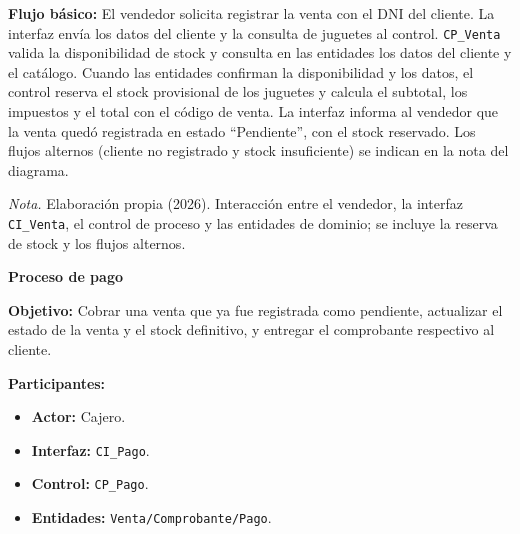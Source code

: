 \documentclass[12pt,a4paper]{article}
\begin{document}
\begin{landscape}
\begin{minipage}[t]{0.40\linewidth}
\medskip
\textbf{Flujo b\'asico:} El vendedor solicita registrar la venta con el DNI del cliente. La interfaz env\'ia los datos del cliente y la consulta de juguetes al control. \texttt{CP\_Venta} valida la disponibilidad de stock y consulta en las entidades los datos del cliente y el cat\'alogo. Cuando las entidades confirman la disponibilidad y los datos, el control reserva el stock provisional de los juguetes y calcula el subtotal, los impuestos y el total con el c\'odigo de venta. La interfaz informa al vendedor que la venta qued\'o registrada en estado ``Pendiente'', con el stock reservado. Los flujos alternos (cliente no registrado y stock insuficiente) se indican en la nota del diagrama.
\end{minipage}\hfill
\begin{minipage}[t]{0.58\linewidth}
\vspace{0pt}
\centering
{}
\label{fig:seq_cus01}
\resizebox{!}{0.46\textheight}{}
\par\vspace{0.5ex}
{\raggedright \small \emph{Nota.} Elaboraci\'on propia (2026). Interacci\'on entre el vendedor, la interfaz \texttt{CI\_Venta}, el control de proceso y las entidades de dominio; se incluye la reserva de stock y los flujos alternos.\par}
\end{minipage}

\clearpage
\par\vspace{0.3cm}

\noindent\begin{minipage}[t]{0.40\linewidth}
\vspace{0pt}
\small \singlespacing \raggedright
\textbf{Proceso de pago}

\medskip
\textbf{Objetivo:} Cobrar una venta que ya fue registrada como pendiente, actualizar el estado de la venta y el stock definitivo, y entregar el comprobante respectivo al cliente.

\medskip
\textbf{Participantes:}
\begin{itemize}\setlength{\itemsep}{1pt}\setlength{\parskip}{0pt}
  \item \textbf{Actor:} Cajero.
  \item \textbf{Interfaz:} \texttt{CI\_Pago}.
  \item \textbf{Control:} \texttt{CP\_Pago}.
  \item \textbf{Entidades:} \texttt{Venta/Comprobante/Pago}.
\end{itemize}


\end{minipage}
\end{landscape}
\end{document}
